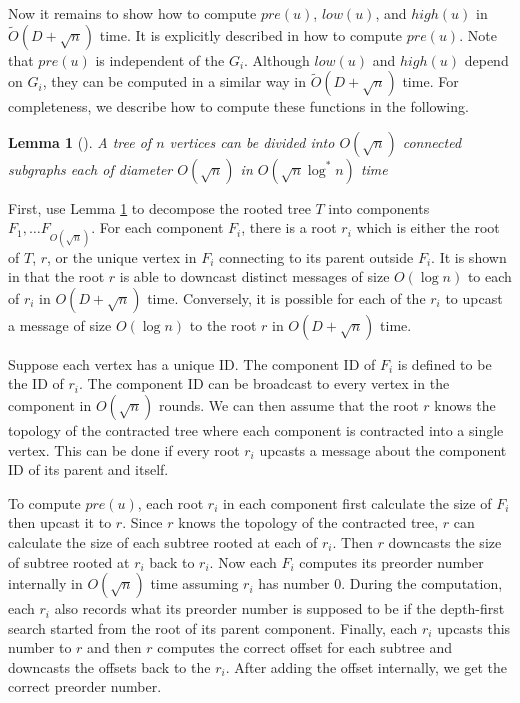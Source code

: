 \documentclass[11pt]{article}
\newtheorem{lemma}[theorem]{Lemma}
\begin{document}
Now it remains to show how to compute $\mathit{pre}(u)$, $\mathit{low}(u)$, and $\mathit{high}(u)$ in $\tilde{O}(D+\sqrt{n})$ time. It is explicitly described in \cite{Thurimella97} how to compute $\mathit{pre}(u)$. Note that $\mathit{pre}(u)$ is independent of the $G_i$. Although $\mathit{low}(u)$ and $\mathit{high}(u)$ depend on $G_i$, they can be computed in a similar way in $\tilde{O}(D+\sqrt{n})$ time. For completeness, we describe how to compute these functions in the following.

\begin{lemma}[\cite{GKP93,KP95}]\label{lem:decompose} A tree of $n$ vertices can be divided into $O(\sqrt{n})$ connected subgraphs each of diameter $O(\sqrt{n})$ in $O(\sqrt{n}\log^{*}n)$ time\end{lemma}

First, use Lemma \ref{lem:decompose} to decompose the rooted tree $T$ into components $F_1,\ldots F_{O(\sqrt{n})}$. For each component $F_i$, there is a root $r_i$ which is either the root of $T$, $r$, or the unique vertex in $F_i$ connecting to its parent outside $F_i$. It is shown in \cite{Peleg} that the root $r$ is able to downcast distinct messages of size $O(\log n)$ to each of $r_i$ in $O(D+\sqrt{n})$ time. Conversely, it is possible for each of the $r_i$ to upcast a message of size $O(\log n)$ to the root $r$ in $O(D+\sqrt{n})$ time. 

Suppose each vertex has a unique ID. The component ID of $F_i$ is defined to be the ID of $r_i$. The component ID can be broadcast to every vertex in the component in $O(\sqrt{n})$ rounds. We can then assume that the root $r$ knows the topology of the contracted tree where each component is contracted into a single vertex. This can be done if every root $r_i$ upcasts a message about the component ID of its parent and itself.

To compute $\mathit{pre}(u)$, each root $r_i$ in each component first calculate the size of $F_i$ then upcast it to $r$. Since $r$ knows the topology of the contracted tree, $r$ can calculate the size of each subtree rooted at each of $r_i$. Then $r$ downcasts the size of subtree rooted at $r_i$ back to $r_i$. Now each $F_i$ computes its preorder number internally in $O(\sqrt{n})$ time assuming $r_i$ has number $0$. During the computation, each $r_i$ also records what its preorder number is supposed to be if the depth-first search started from the root of its parent component. Finally, each $r_i$ upcasts this number to $r$ and then $r$ computes the correct offset for each subtree and downcasts the offsets back to the $r_i$. After adding the offset internally, we get the correct preorder number.
\end{document}
